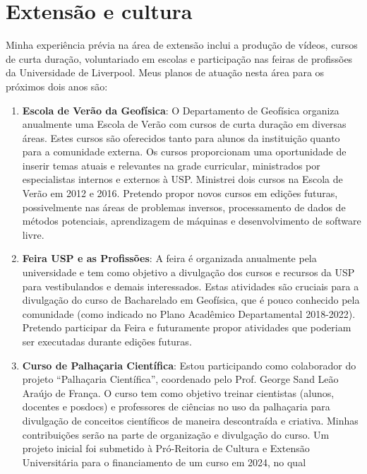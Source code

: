 \documentclass[11pt,a4paper,oneside]{book}
\begin{document}
\chapter{Extensão e cultura}

Minha experiência prévia na área de extensão inclui a produção de vídeos,
cursos de curta duração, voluntariado em escolas e participação nas feiras de
profissões da Universidade de Liverpool.
Meus planos de atuação nesta área para os próximos dois anos são:

\begin{enumerate}
  \item \textbf{Escola de Verão da Geofísica}: O Departamento de Geofísica
    organiza anualmente uma Escola de Verão com cursos de curta duração em
    diversas áreas. Estes cursos são oferecidos tanto para alunos da
    instituição quanto para a comunidade externa. Os cursos proporcionam uma
    oportunidade de inserir temas atuais e relevantes na grade curricular,
    ministrados por especialistas internos e externos à USP. Ministrei dois
    cursos na Escola de Verão em 2012 e 2016. Pretendo propor novos cursos em
    edições futuras, possivelmente nas áreas de problemas inversos,
    processamento de dados de métodos potenciais, aprendizagem de máquinas e
    desenvolvimento de software livre.
  \item \textbf{Feira USP e as Profissões}: A feira é organizada anualmente
    pela universidade e tem como objetivo a divulgação dos cursos e recursos da
    USP para vestibulandos e demais interessados. Estas atividades são cruciais
    para a divulgação do curso de Bacharelado em Geofísica, que é pouco conhecido
    pela comunidade (como indicado no Plano Acadêmico Departamental 2018-2022).
    Pretendo participar da Feira e futuramente propor atividades que poderiam
    ser executadas durante edições futuras.
  \item \textbf{Curso de Palhaçaria Científica}: Estou participando como
    colaborador do projeto ``Palhaçaria Científica'', coordenado pelo Prof.
    George Sand Leão Araújo de França. O curso tem como objetivo treinar
    cientistas (alunos, docentes e posdocs) e professores de ciências no uso da
    palhaçaria para divulgação de conceitos científicos de maneira descontraída
    e criativa. Minhas contribuições serão na parte de organização e divulgação
    do curso. Um projeto inicial foi submetido à Pró-Reitoria de Cultura e
    Extensão Universitária para o financiamento de um curso em 2024, no qual

\end{enumerate}
\end{document}
